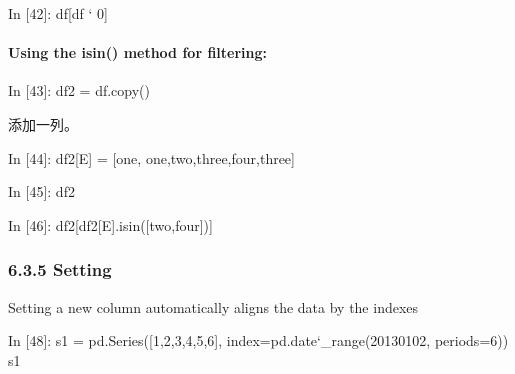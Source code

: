 \documentclass[letterpaper,10pt,english]{sphinxmanual}
\def\PYGZus{\char`\_}
\def\PYGZgt{\char`\>}
\def\PYGZsq{\char`\'}
\renewcommand\PYGZsq{\textquotesingle}
\begin{document}
\begin{OriginalVerbatim}[commandchars=\\\{\}]
\textcolor{nbsphinxin}{In [42]: }df[df \PYGZgt{} 0]
\end{OriginalVerbatim}


\paragraph{Using the isin() method for filtering:}
\label{pandas_quickstart:Using-the-isin()-method-for-filtering:}
\begin{OriginalVerbatim}[commandchars=\\\{\}]
\textcolor{nbsphinxin}{In [43]: }df2 = df.copy()
\end{OriginalVerbatim}

添加一列。

\begin{OriginalVerbatim}[commandchars=\\\{\}]
\textcolor{nbsphinxin}{In [44]: }df2[\PYGZsq{}E\PYGZsq{}] = [\PYGZsq{}one\PYGZsq{}, \PYGZsq{}one\PYGZsq{},\PYGZsq{}two\PYGZsq{},\PYGZsq{}three\PYGZsq{},\PYGZsq{}four\PYGZsq{},\PYGZsq{}three\PYGZsq{}]
\end{OriginalVerbatim}

\begin{OriginalVerbatim}[commandchars=\\\{\}]
\textcolor{nbsphinxin}{In [45]: }df2
\end{OriginalVerbatim}

\begin{OriginalVerbatim}[commandchars=\\\{\}]
\textcolor{nbsphinxin}{In [46]: }df2[df2[\PYGZsq{}E\PYGZsq{}].isin([\PYGZsq{}two\PYGZsq{},\PYGZsq{}four\PYGZsq{}])]
\end{OriginalVerbatim}


\subsubsection{6.3.5 Setting}
\label{pandas_quickstart:6.3.5-Setting}
Setting a new column automatically aligns the data by the indexes

\begin{OriginalVerbatim}[commandchars=\\\{\}]
\textcolor{nbsphinxin}{In [48]: }s1 = pd.Series([1,2,3,4,5,6], index=pd.date\PYGZus{}range(\PYGZsq{}20130102\PYGZsq{}, periods=6))
         s1
\end{OriginalVerbatim}
\end{document}
